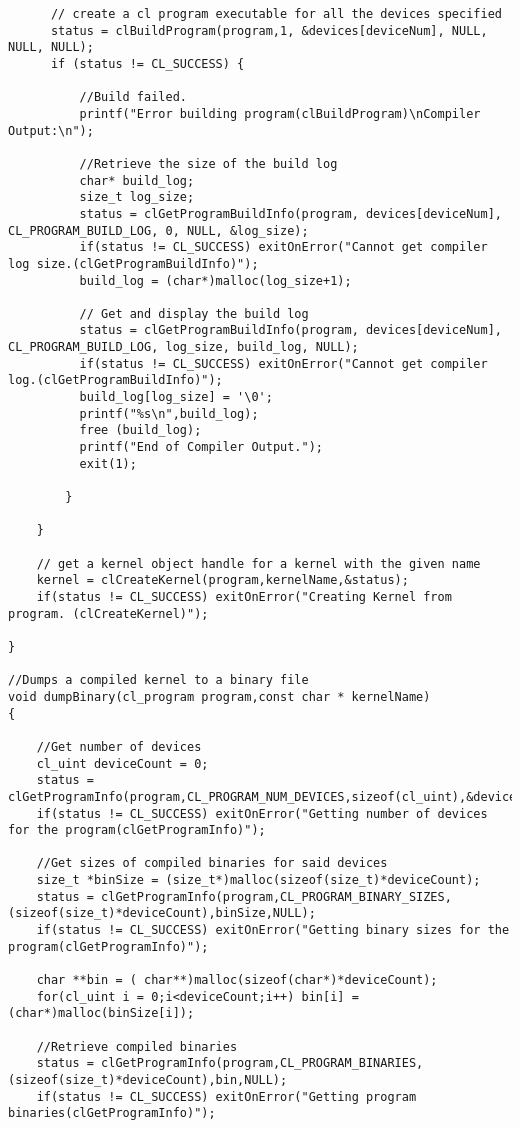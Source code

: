 \begin{verbatim}
	  // create a cl program executable for all the devices specified 
	  status = clBuildProgram(program,1, &devices[deviceNum], NULL, NULL, NULL);
	  if (status != CL_SUCCESS) {
		  
		  //Build failed.
		  printf("Error building program(clBuildProgram)\nCompiler Output:\n");
		  
		  //Retrieve the size of the build log
		  char* build_log;
		  size_t log_size;
		  status = clGetProgramBuildInfo(program, devices[deviceNum], CL_PROGRAM_BUILD_LOG, 0, NULL, &log_size);
		  if(status != CL_SUCCESS) exitOnError("Cannot get compiler log size.(clGetProgramBuildInfo)");
		  build_log = (char*)malloc(log_size+1);
		  
		  // Get and display the build log
		  status = clGetProgramBuildInfo(program, devices[deviceNum], CL_PROGRAM_BUILD_LOG, log_size, build_log, NULL);
		  if(status != CL_SUCCESS) exitOnError("Cannot get compiler log.(clGetProgramBuildInfo)");
		  build_log[log_size] = '\0';
		  printf("%s\n",build_log);
		  free (build_log);
		  printf("End of Compiler Output.");
		  exit(1);
				  
		}

	}
	
	// get a kernel object handle for a kernel with the given name 
	kernel = clCreateKernel(program,kernelName,&status);
	if(status != CL_SUCCESS) exitOnError("Creating Kernel from program. (clCreateKernel)");

}

//Dumps a compiled kernel to a binary file
void dumpBinary(cl_program program,const char * kernelName)
{
 	
	//Get number of devices
	cl_uint deviceCount = 0;
	status = clGetProgramInfo(program,CL_PROGRAM_NUM_DEVICES,sizeof(cl_uint),&deviceCount,NULL);
	if(status != CL_SUCCESS) exitOnError("Getting number of devices for the program(clGetProgramInfo)");
	
	//Get sizes of compiled binaries for said devices
	size_t *binSize = (size_t*)malloc(sizeof(size_t)*deviceCount);
	status = clGetProgramInfo(program,CL_PROGRAM_BINARY_SIZES,(sizeof(size_t)*deviceCount),binSize,NULL);
	if(status != CL_SUCCESS) exitOnError("Getting binary sizes for the program(clGetProgramInfo)");

	char **bin = ( char**)malloc(sizeof(char*)*deviceCount);
	for(cl_uint i = 0;i<deviceCount;i++) bin[i] = (char*)malloc(binSize[i]);

	//Retrieve compiled binaries
	status = clGetProgramInfo(program,CL_PROGRAM_BINARIES,(sizeof(size_t)*deviceCount),bin,NULL);
	if(status != CL_SUCCESS) exitOnError("Getting program binaries(clGetProgramInfo)");


\end{verbatim}
